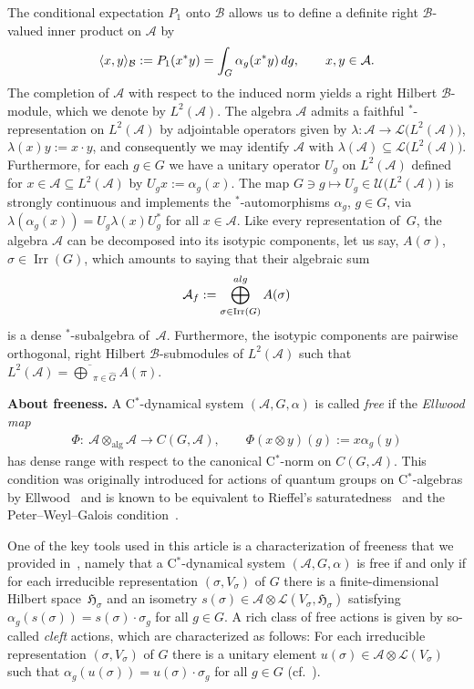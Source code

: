 \documentclass[11pt]{article}
\numberwithin{equation}{section}
\numberwithin{equation}{section}
\newcommand*{\tensor}{\otimes}		%
\DeclarePairedDelimiter{\scal}{\langle}{\rangle}	%
\newcommand*{\Star}{$^*$\nobreakdash}
\newcommand*{\hilb}{\mathfrak}		%
\newcommand*{\alg}{\mathcal}		%
\newcommand*{\hH}{\hilb{H}}			%
\newcommand*{\aA}{\alg{A}}			%
\newcommand*{\aB}{\alg{B}} 			%
\newcommand*{\End}{\mathcal{L}} %
\newcommand*{\Cont}{C}
\DeclareMathOperator{\Irrep}{Irr} 			%
\begin{document}
The conditional expectation $P_1$ onto $\aB$ allows us to define a definite right $\aB$\nobreakdash-valued inner product on $\aA$ by
\begin{gather*}
	\scal{x,y}_\aB := P_1(x^*y) = \int_G \alpha_g(x^*y) \, {\rm d}g,
	\qquad
	x,y \in \aA.
\end{gather*}
The completion of $\aA$ with respect to the induced norm yields a right Hilbert $\aB$\nobreakdash-module, which we denote by $L^2(\aA)$.
The algebra $\aA$ admits a faithful \Star-representation on $L^2(\aA)$ by adjointable operators given by $\lambda\colon \aA \to \End \big( L^2(\aA) \big)$, $\lambda(x)y := x \cdot y$, and consequently we may identify $\aA$ with $\lambda(\aA) \subseteq \End \big( L^2(\aA) \big)$.
Furthermore, for each $g \in G$ we have a unitary operator $U_g$ on $L^2(\aA)$ defined for $x \in \aA \subseteq L^2(\aA)$ by $U_g x := \alpha_g(x)$.
The map $G \ni g \mapsto U_g \in \mathcal{U}\big( L^2(\aA) \big)$ is strongly continuous and implements the \Star-automorphisms $\alpha_g$, $g \in G$, via $\lambda ( \alpha_g(x)) = U_g \lambda(x) U_g^*$ for all $x \in \aA$.
Like every representation of~$G$, the algebra $\aA$ can be decomposed into its isotypic components, let us say, $A(\sigma)$, $\sigma \in \Irrep(G)$, which amounts to saying that their algebraic sum
\begin{gather*}
	\aA_f:= \bigoplus_{\sigma \in \Irrep(G)}^{\rm alg} A(\sigma)
\end{gather*}
is a dense \Star-subalgebra of~$\aA$.
Furthermore, the isotypic components are pairwise orthogonal, right Hilbert $\aB$-submodules of $L^2(\aA)$ such that $L^2(\aA) = \overline{\bigoplus}_{\pi \in \hat G} A(\pi)$.

{\bf About freeness.}
A C\Star-dynamical system $(\aA,G,\alpha)$ is called \emph{free} if the \emph{Ellwood map}
\begin{align*}
	\Phi\colon \ \aA \tensor_{\text{alg}} \aA \rightarrow C(G,\aA),
	\qquad
	\Phi(x\tensor y)(g):=x \alpha_g(y)
\end{align*}
has dense range with respect to the canonical C\Star-norm on $\Cont(G,\aA)$.
This condition was originally introduced for actions of quantum groups on C\Star-algebras by Ellwood~\cite{Ell00} and is known to be equivalent to Rieffel's saturatedness~\cite{Rieffel91} and the Peter--Weyl--Galois condition~\cite{BaCoHa15}.

One of the key tools used in this article is a characterization of freeness that we provided in~\cite[Lemma~3.3]{SchWa17c}, namely that a C\Star-dynamical system $(\aA,G,\alpha)$ is free if and only if for each irreducible representation $(\sigma,V_\sigma)$ of $G$ there is a finite-dimensional Hilbert space~$\hH_\sigma$ and an isometry $s(\sigma) \in \aA \tensor \End(V_\sigma,\hH_\sigma)$ satisfying $\alpha_g(s(\sigma))=s(\sigma) \cdot \sigma_g$ for all $g \in G$.
A rich class of free actions is given by so-called \emph{cleft} actions, which are characterized as follows:
For each irreducible representation $(\sigma,V_\sigma)$ of $G$ there is a unitary element \mbox{$u(\sigma) \in \aA \tensor \End(V_\sigma)$} such that $\alpha_g(u(\sigma))=u(\sigma) \cdot \sigma_g$ for all $g \in G$ (cf.~\cite[Definition~4.1]{SchWa17b}).
\end{document}
